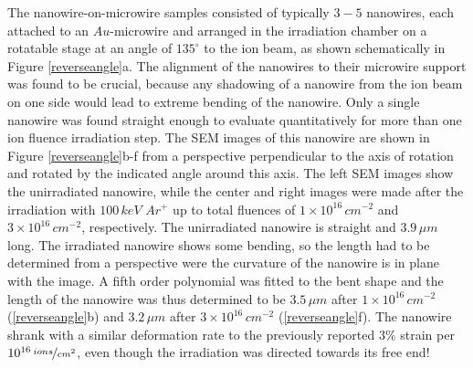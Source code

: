 The nanowire-on-microwire samples consisted of typically $3-5$ nanowires, each attached to an $Au$-microwire and arranged in the irradiation chamber on a rotatable stage at an angle of $135^\circ$ to the ion beam, as shown schematically in Figure \ref{reverseangle}a. The alignment of the nanowires to their microwire support was found to be crucial, because any shadowing of a nanowire from the ion beam on one side would lead to extreme bending of the nanowire. Only a single nanowire was found straight enough to evaluate quantitatively for more than one ion fluence irradiation step. The SEM images of this nanowire are shown in Figure \ref{reverseangle}b-f from a perspective perpendicular to the axis of rotation and rotated by the indicated angle around this axis. The left SEM images show the unirradiated nanowire, while the center and right images were made after the irradiation with $100\,keV\,\,Ar^+$ up to total fluences of $1\times10^{16}\,cm^{-2}$ and $3\times10^{16}\,cm^{-2}$, respectively. The unirradiated nanowire is straight and $3.9\,\mu m$ long. The irradiated nanowire shows some bending, so the length had to be determined from a perspective were the curvature of the nanowire is in plane with the image. A fifth order polynomial was fitted to the bent shape and the length of the nanowire was thus determined to be $3.5\,\mu m$ after $1\times10^{16}\,cm^{-2}$ (\ref{reverseangle}b) and $3.2\,\mu m$ after $3\times10^{16}\,cm^{-2}$ (\ref{reverseangle}f). The nanowire shrank with a similar deformation rate to the previously reported $3\%$ strain per $10^{16}\,\nicefrac{ions}{cm^2}$, even though the irradiation was directed towards its free end!

